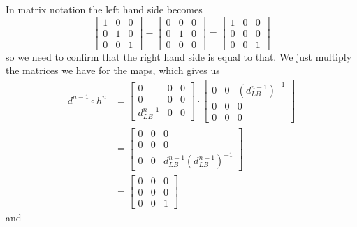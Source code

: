In matrix notation the left hand side becomes
\begin{equation*}
\begin{bmatrix}
1 & 0 & 0 \\
0 & 1 & 0 \\
0 & 0 & 1
\end{bmatrix}
-
\begin{bmatrix}
0 & 0 & 0 \\
0 & 1 & 0 \\
0 & 0 & 0
\end{bmatrix}
=
\begin{bmatrix}
1 & 0 & 0 \\
0 & 0 & 0 \\
0 & 0 & 1
\end{bmatrix}
\end{equation*}
so we need to confirm that the right hand side is equal to that. We just multiply the matrices we have for the maps, which gives us
\begin{align*}
    d^{n-1}\circ h^n 
    &= 
    \begin{bmatrix}
    0 & 0 & 0 \\
    0 & 0 & 0 \\
    d^{n-1}_{LB} & 0 & 0
    \end{bmatrix}
    \cdot
    \begin{bmatrix}
    0 & 0 & (d_{LB}^{n-1})^{-1}\\
    0 & 0 & 0\\
    0 & 0 & 0
    \end{bmatrix} \\
    &= 
    \begin{bmatrix}
    0 & 0 & 0 \\
    0 & 0 & 0 \\
    0 & 0 & d^{n-1}_{LB}(d_{LB}^{n-1})^{-1} 
    \end{bmatrix} \\
    &= 
    \begin{bmatrix}
    0 & 0 & 0 \\
    0 & 0 & 0 \\
    0 & 0 & 1 
    \end{bmatrix}
\end{align*}
and
